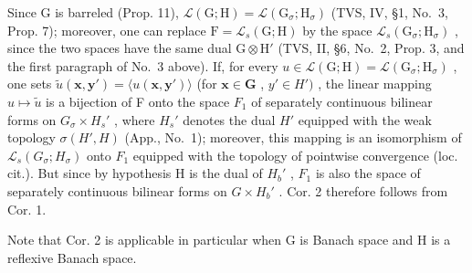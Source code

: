 Since G is barreled (Prop. 11), \(\mathcal{L}(\mathrm{G};\mathrm{H}) = \mathcal{L}(\mathrm{G}_{\sigma};\mathrm{H}_{\sigma})\) (TVS, IV, §1, No.~3, Prop. 7); moreover, one can replace \(\mathrm{F} = \mathcal{L}_s(\mathrm{G};\mathrm{H})\) by the space \(\mathcal{L}_s(\mathrm{G}_{\sigma};\mathrm{H}_{\sigma})\) , since the two spaces have the same dual \(\mathrm{G} \otimes \mathrm{H}'\) (TVS, II, §6, No.~2, Prop. 3, and the first paragraph of No.~3 above). If, for every \(u \in \mathcal{L}(\mathrm{G};\mathrm{H}) = \mathcal{L}(\mathrm{G}_{\sigma};\mathrm{H}_{\sigma})\) , one sets \(\widetilde{u}(\mathbf{x},\mathbf{y}') = \langle u(\mathbf{x},\mathbf{y}') \rangle\) (for \(\mathbf{x} \in \mathbf{G}\) , \(y' \in H')\) , the linear mapping \(u \mapsto \widetilde{u}\) is a bijection of F onto the space \(F_1\) of separately continuous bilinear forms on \(G_\sigma \times H_s'\) , where \(H_s'\) denotes the dual \(H'\) equipped with the weak topology \(\sigma(H', H)\) (App., No.~1); moreover, this mapping is an isomorphism of \(\mathcal{L}_s(G_\sigma; H_\sigma)\) onto \(F_1\) equipped with the topology of pointwise convergence (loc. cit.). But since by hypothesis H is the dual of \(H_b'\) , \(F_1\) is also the space of separately continuous bilinear forms on \(G \times H_b'\) . Cor. 2 therefore follows from Cor. 1.

Note that Cor. 2 is applicable in particular when G is Banach space and H is a reflexive Banach space.

